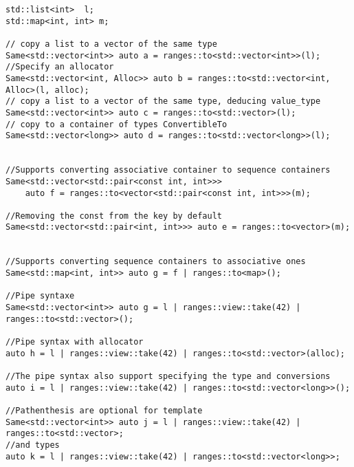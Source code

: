 \documentclass{wg21}
\begin{document}
\begin{verbatim}
std::list<int>  l;
std::map<int, int> m;

// copy a list to a vector of the same type
Same<std::vector<int>> auto a = ranges::to<std::vector<int>>(l);
//Specify an allocator
Same<std::vector<int, Alloc>> auto b = ranges::to<std::vector<int, Alloc>(l, alloc);
// copy a list to a vector of the same type, deducing value_type
Same<std::vector<int>> auto c = ranges::to<std::vector>(l);
// copy to a container of types ConvertibleTo
Same<std::vector<long>> auto d = ranges::to<std::vector<long>>(l);


//Supports converting associative container to sequence containers 
Same<std::vector<std::pair<const int, int>>> 
	auto f = ranges::to<vector<std::pair<const int, int>>>(m);

//Removing the const from the key by default
Same<std::vector<std::pair<int, int>>> auto e = ranges::to<vector>(m);


//Supports converting sequence containers to associative ones
Same<std::map<int, int>> auto g = f | ranges::to<map>();

//Pipe syntaxe
Same<std::vector<int>> auto g = l | ranges::view::take(42) | ranges::to<std::vector>();

//Pipe syntax with allocator
auto h = l | ranges::view::take(42) | ranges::to<std::vector>(alloc);

//The pipe syntax also support specifying the type and conversions
auto i = l | ranges::view::take(42) | ranges::to<std::vector<long>>();

//Pathenthesis are optional for template
Same<std::vector<int>> auto j = l | ranges::view::take(42) | ranges::to<std::vector>;
//and types
auto k = l | ranges::view::take(42) | ranges::to<std::vector<long>>; 
 
\end{verbatim}

\pagebreak
\end{document}
